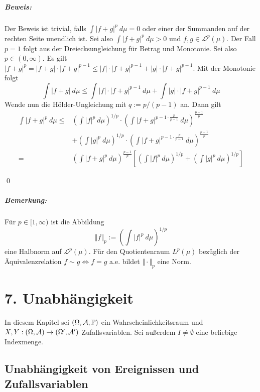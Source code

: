 \documentclass[12pt]{report}
\begin{document}
 \paragraph{Beweis:}Der Beweis ist trivial, falls $\displaystyle\int |f+g|^p\ d\mu=0$ oder einer der Summanden auf der rechten Seite unendlich ist. Sei also $\displaystyle\int |f+g|^p\ d\mu>0$ und $f,g\in\mathcal{L}^p(\mu)$. Der Fall $p=1$ folgt aus der Dreiecksungleichung f\"ur Betrag und Monotonie. Sei also $p\in(0,\infty)$. Es gilt $|f+g|^p=|f+g|\cdot|f+g|^{p-1}\leq|f|\cdot|f+g|^{p-1}+|g|\cdot|f+g|^{p-1}$. Mit der Monotonie folgt
 $$\int|f+g|\ d\mu\leq\int |f|\cdot|f+g|^{p-1}\ d\mu+\int |g|\cdot|f+g|^{p-1}\ d\mu$$
 Wende nun die H\"older-Ungleichung mit $q:=p/(p-1)$ an. Dann gilt
 \begin{align*}
     \int|f+g|^p\ d\mu
     \leq& \left(\int |f|^p\ d\mu\right)^{1/p}\cdot\left(\int |f+g|^{p-1\cdot\frac{p}{p-1}}\ d\mu\right)^{\frac{p-1}{p}}\\&+\left(\int |g|^p\ d\mu\right)^{1/p}\cdot\left(\int |f+g|^{p-1\cdot\frac{p}{p-1}}\ d\mu\right)^{\frac{p-1}{p}}\\
     =&\left(\int |f+g|^p\ d\mu\right)^{\frac{p-1}{p}}\left[\left(\int |f|^p\ d\mu\right)^{1/p}+\left(\int |g|^p\ d\mu\right)^{1/p}\right]
 \end{align*}
 
 \qed
 
 \paragraph{Bemerkung:}F\"ur $p\in[1,\infty)$ ist die Abbildung
 $$\Vert f\Vert_p:=\left(\int |f|^p\ d\mu\right)^{1/p}$$
eine Halbnorm auf $\mathcal{L}^p(\mu)$. F\"ur den Quotientenraum $L^p(\mu)$ bez\"uglich der \"Aquivalenzrelation $f\sim g\iff f=g$ a.e. bildet $\Vert\cdot \Vert_p$ eine Norm.
 
\chapter*{7. Unabh\"angigkeit}

In diesem Kapitel sei $(\Omega, \mathcal{A}, \mathbb{P})$ ein Wahrscheinlichkeitsraum und $X,Y:(\Omega,\mathcal{A})\to(\Omega',\mathcal{A}')$ Zufallsvariablen. Sei au\ss{}erdem $I\neq\emptyset$ eine beliebige Indexmenge. 
 
\section*{Unabh\"angigkeit von Ereignissen und Zufallsvariablen}
 
\end{document}
